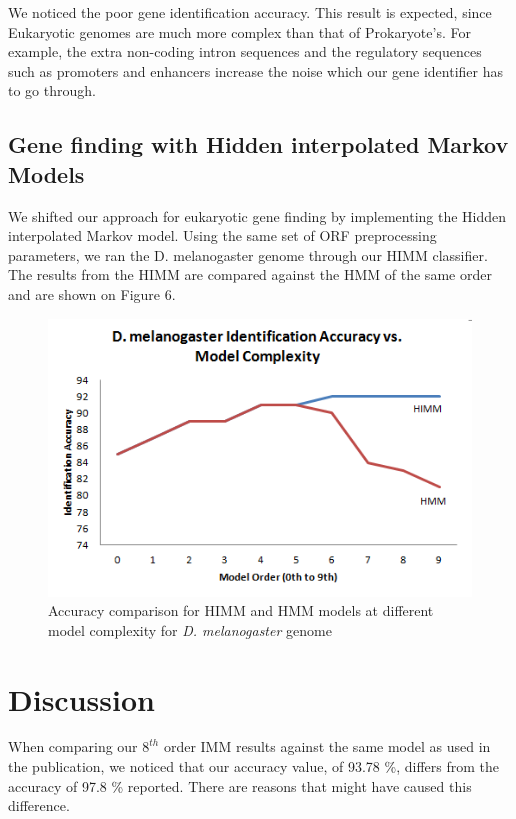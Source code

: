 \documentclass[11pt,letterpaper]{article}
\begin{document}
We noticed the poor gene identification accuracy. This result is expected, since Eukaryotic genomes are much more complex than that of Prokaryote’s. For example, the extra non-coding intron sequences and the regulatory sequences such as promoters and enhancers increase the noise which our gene identifier has to go through. 

\subsection{Gene finding with Hidden interpolated Markov Models}

We shifted our approach for eukaryotic gene finding by implementing the Hidden interpolated Markov model. Using the same set of ORF preprocessing parameters, we ran the D. melanogaster genome through our HIMM classifier. The results from the HIMM are compared against the HMM of the same order and are shown on Figure 6.
\begin{figure}
	\begin{center}
		\includegraphics[scale=0.8]{plots/accuracy_vs_model_complexity_drosophila_hmm.png}
	\end{center}
	\caption{\label{font-table} Accuracy comparison for HIMM and HMM models at different model complexity for \emph{D. melanogaster} genome}
\end{figure}




\section{Discussion}

When comparing our $8^{th}$ order IMM results against the same model as used in the publication, we noticed that our accuracy value, of 93.78 \%, differs from the accuracy of 97.8 \% reported. There are reasons that might have caused this difference.
\end{document}
